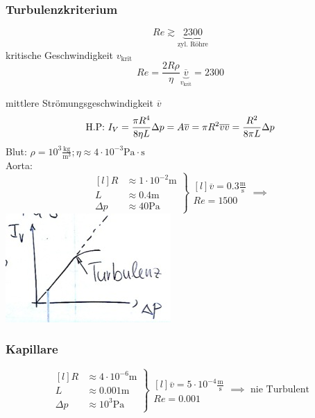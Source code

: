 \subsubsection{Turbulenzkriterium}
\[ Re \gtrsim \underbrace{2300}_{\text{zyl. Röhre}} \]
kritische Geschwindigkeit $v_{\text{krit}}$
\[ Re = \frac{2R\rho}{\eta} \underbrace{\overline{v}}_{v_{\text{krit}}} = 2300 \]

\begin{bsp*}[ note = Blutströmung ]
	mittlere Strömungsgeschwindigkeit $\overline{v}$
	\[
		\text{H.P: } I_V = \frac{\pi R^4}{8 \eta L} \Delta p = A \overline{v} = \pi R^2 \overline{v} \\
		\overline{v} = \frac{R^2}{8 \pi L} \Delta p
	\]
	Blut: $\rho = 10^3 \frac{\text{kg}}{\text{m}^3} ; \eta \approx 4 \cdot 10^{-3} \text{Pa} \cdot \text{s}$ \\
	Aorta:
	\[
		\left. \begin{matrix*}[l]
			R &\approx 1 \cdot 10^{-2} \text{m} \\
			L &\approx 0.4 \text{m} \\
			\Delta p &\approx 40 \text{Pa}
		\end{matrix*} \right\} \begin{matrix*}[l]
			\overline{v} = 0.3 \frac{\text{m}}{\text{s}} \\
			Re = 1500
		\end{matrix*} \implies
	\]
	\includegraphics{Bild106}
\end{bsp*}

\subsubsection{Kapillare}
\[
	\left. \begin{matrix*}[l]
		R &\approx 4 \cdot 10^{-6} \text{m} \\
		L &\approx 0.001 \text{m} \\
		\Delta p &\approx 10^3 \text{Pa}
	\end{matrix*} \right\} \begin{matrix*}[l]
		\overline{v} = 5 \cdot 10^{-4} \frac{\text{m}}{\text{s}} \\
		Re = 0.001
	\end{matrix*} \implies \text{ nie Turbulent}
\]

